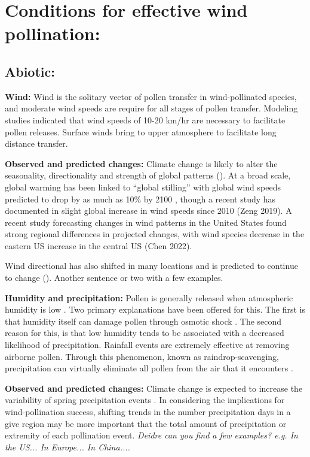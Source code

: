 \documentclass[12pt]{article}
\begin{document}
\section*{Conditions for effective wind pollination:}

\subsection*{Abiotic:}

\textbf{Wind:} Wind is the solitary vector of pollen transfer in wind-pollinated species, and moderate wind speeds are require for all stages of pollen transfer. Modeling studies indicated that wind speeds of 10-20 km/hr are necessary to facilitate pollen releases. Surface winds bring to upper atmosphere to facilitate long distance transfer. 

\textbf{Observed and predicted changes:} Climate change is likely to alter the seasonality, directionality and strength of global patterns (). At a broad scale, global warming has been linked to “global stilling” with global wind speeds predicted to drop by as much as 10\% by 2100 \citep{IPCC2013}, though a recent study has documented in slight global increase in wind speeds since 2010 (Zeng 2019).
A recent study forecasting changes in wind patterns in the United States found strong regional differences in projected changes, with wind species decrease in the eastern US increase in the central US (Chen 2022).

Wind directional has also shifted in many locations and is predicted to continue to change (). Another sentence or two with a few examples.





\textbf{Humidity and precipitation:} Pollen is generally released when atmospheric humidity is low \citep{Niklas1985, Whitehead1969}. Two primary explanations have been offered for this. The first is that humidity itself can damage pollen through osmotic shock \citep{Niklas1985}. The second reason for this, is that low humidity tends to be associated with a decreased likelihood of precipitation. Rainfall events are extremely effective at removing airborne pollen. Through this phenomenon, known as raindrop-scavenging, precipitation can virtually eliminate all pollen from the air that it encounters \citep{Kluska:2020aa}.

\textbf{Observed and predicted changes:} Climate change is expected to increase the variability of spring precipitation events \citep{IPCC2013}. In considering the implications for wind-pollination success, shifting trends in the number precipitation days in a give region may be more important that the total amount of precipitation or extremity of each pollination event. \emph{Deidre can you find a few examples? e.g. In the US... In Europe... In China....}
\end{document}

